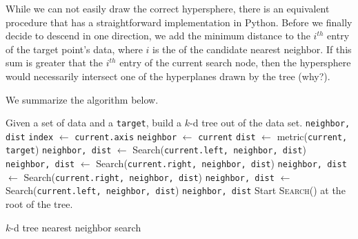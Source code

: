 While we can not easily draw the correct hypersphere, there is an equivalent procedure that has a straightforward implementation in Python.
Before we finally decide to descend in one direction, we add the minimum distance to the $i^{th}$ entry of the target point's data, where $i$ is the  of the candidate nearest neighbor.
If this sum is greater that the $i^{th}$ entry of the current search node, then the hypersphere would necessarily intersect one of the hyperplanes drawn by the tree (why?).

We summarize the algorithm below.

\begin{algorithm}[h] %
\begin{algorithmic}[1]
\State Given a set of data and a \texttt{target}, build a $k$-d tree out of the data set.
    \State {} \texttt{neighbor, dist}
\EndIf
\State \texttt{index} $\gets$ \texttt{current.axis}
    \State \texttt{neighbor} $\gets$ \texttt{current}
    \State \texttt{dist} $\gets$ metric(\texttt{current, target})
\EndIf
{}
    \State \texttt{neighbor, dist} $\gets$ Search(\texttt{current.left, neighbor, dist})
        \State \texttt{neighbor, dist} $\gets$ Search(\texttt{current.right, neighbor, dist})
    \EndIf
\Else
    \State \texttt{neighbor, dist} $\gets$ Search(\texttt{current.right, neighbor, dist})
        \State \texttt{neighbor, dist} $\gets$ Search(\texttt{current.left, neighbor, dist})
    \EndIf
\EndIf
\State {} \texttt{neighbor, dist}
\EndProcedure
\State Start \textsc{Search()} at the root of the tree.
\end{algorithmic}
\caption{$k$-d tree nearest neighbor search}
\label{alg:kdneighborz}
\end{algorithm}

